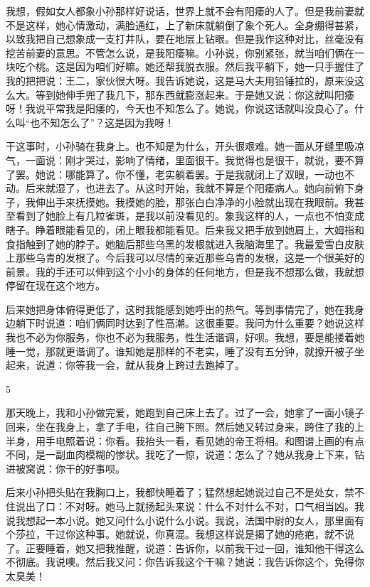 我想，假如女人都象小孙那样好说话，世界上就不会有阳痿的人了。但是我前妻就不是这样，她心情激动，满脸通红，上了新床就躺倒了象个死人。全身绷得甚紧，以致我把自己想象成一支打井队，要在地层上钻眼。但是我作这种对比，丝毫没有挖苦前妻的意思。不管怎么说，是我阳痿嘛。小孙说，你别紧张，就当咱们俩在一块吃个桃。这是因为咱们好嘛。她还帮我脱衣服。然后我平躺下，她一只手握住了我的把把说：王二，家伙很大呀。我告诉她说，这是马大夫用铅锤拉的，原来没这么大。等到她伸手兜了我几下，那东西就膨涨起来。于是她又说：你这就叫阳痿呀！我说平常我是阳痿的，今天也不知怎么了。她说，你说这话就叫没良心了。什么叫“也不知怎么了”？这是因为我呀！ 

干这事时，小孙骑在我身上。也不知是为什么，开头很艰难。她一面从牙缝里吸凉气，一面说：刚才哭过，影响了情绪，里面很干。我觉得也是很干，就说，要不算了罢。她说：哪能算了。你不懂，老实躺着罢。于是我就闭上了双眼，一动也不动。后来就湿了，也进去了。从这时开始，我就不算是个阳痿病人。她向前俯下身子，我伸出手来抚摸她。我摸她的脸，那张白白净净的小脸就出现在我眼前。我甚至看到了她脸上有几粒雀斑，是我以前没看见的。象我这样的人，一点也不怕变成瞎子。睁着眼能看见的，闭上眼我都能看见。后来我又把手放到她肩上，大姆指和食指触到了她的脖子。她脑后那些乌黑的发根就进入我脑海里了。我最爱雪白皮肤上那些乌青的发根了。今后我可以尽情的亲近那些乌青的发根，这是一个很美好的前景。我的手还可以伸到这个小小的身体的任何地方，但是我不想那么做，我就想停留在现在这个地方。 

后来她把身体俯得更低了，这时我能感到她呼出的热气。等到事情完了，她在我身边躺下时说道：咱们俩同时达到了性高潮。这很重要。我问为什么重要？她说这样我也不必为你服务，你也不必为我服务，性生活谐调，好呗。我想，要是能搂着她睡一觉，那就更谐调了。谁知她是那样的不老实，睡了没有五分钟，就撩开被子坐起来，说道：你等我一会，就从我身上跨过去跑掉了。 

5 

那天晚上，我和小孙做完爱，她跑到自己床上去了。过了一会，她拿了一面小镜子回来，坐在我身上，拿了手电，往自己胯下照。然后她又转过身来，跨住了我的上半身，用手电照着说：你看。我抬头一看，看见她的帝王将相。和图谱上画的有点不同，是一副血肉模糊的惨状。我吃了一惊，说道：怎么了？她从我身上下来，钻进被窝说：你干的好事呗。 

后来小孙把头贴在我胸口上，我都快睡着了；猛然想起她说过自己不是处女，禁不住说出了口：不对呀。她马上就扬起头来说：什么不对什么不对，口气相当凶。我说我想起一本小说。她又问什么小说什么小说。我说，法国中尉的女人，那里面有个莎拉，干过你这种事。她就说，你真混。我想这样说是揭了她的疮疤，就不说了。正要睡着，她又把我推醒，说道：告诉你，以前我干过一回，谁知他干得这么不彻底。我说噢。然后我又问：你告诉我这个干嘛？她说：我告诉你这个，免得你太臭美！ 


